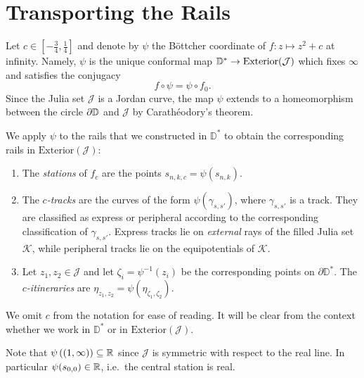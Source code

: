 	
\section{Transporting the Rails} \label{rails-section}
Let $c\in\left[-\frac 34,\frac{1}{4}\right]$ and denote by $\psi$ the Böttcher coordinate of $f: z\mapsto z^2+c$ at infinity. 
Namely, $\psi$ is the unique conformal map $\mathbb{D}^{*}\to\mathrm{Exterior}(\mathcal{J})$  which fixes $\infty$ and satisfies the conjugacy $$f\circ\psi=\psi\circ f_{0}.$$
Since the Julia set $\mathcal J$ is a Jordan curve, the map $\psi$ extends to a homeomorphism between the circle $\partial\mathbb{D}$ and $\mathcal{J}$ by Carathéodory's
theorem.

We apply $\psi$ to the rails that we constructed in $\mathbb D^*$ to obtain the corresponding rails in $\mathrm{Exterior}(\mathcal{J})$:
\begin{definition} \leavevmode
\begin{enumerate}
	\item The 	\emph{stations} of $f_c$ are the points  $s_{n,k,c}=\psi(s_{n,k})$.


\item The \emph{$c$-tracks} are the curves of the form $\psi \left(\gamma_{s,s'}\right)$, where $\gamma_{s,s'}$ is a track. They are classified as express or peripheral according to the corresponding classification of $\gamma_{s,s'}$. 
Express tracks lie on \emph{external} rays of the filled Julia set $\mathcal K$, while peripheral tracks lie on the equipotentials of $\mathcal K$.

\item Let $z_1,z_2 \in \mathcal J$ and let $\zeta_i=\psi^{-1}(z_i)$ be the corresponding points on $\partial \mathbb D^*$. 
The \emph{$c$-itineraries} are $\eta_{z_1,z_2}=\psi(\eta_{\zeta_1,\zeta_2})$.
\end{enumerate}

We omit $c$ from the notation for ease of reading. It will be clear from the context whether we work in $\mathbb D^*$ or in $\mathrm{Exterior}(\mathcal J)$.

\end{definition}

Note that $\psi\left((1,\infty)\right)\subseteq\mathbb{R}$ since $\mathcal{J}$ is symmetric with respect to the real line. In particular $\psi(s_{0,0})\in\mathbb{R}$, i.e.\ the central station is real.

